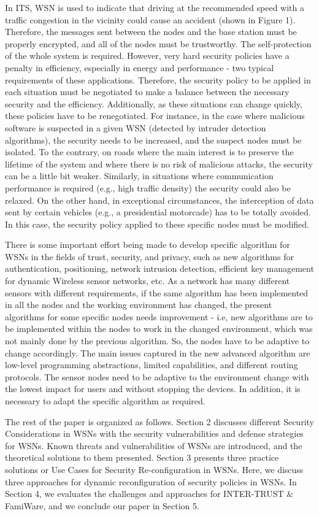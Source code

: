 \documentclass[12pt,a4paper,twoside]{report}
\begin{document}
In ITS, WSN is used to indicate that driving at the recommended speed with a traffic congestion in the vicinity could cause an accident (shown in Figure 1). Therefore, the messages sent between the nodes and the base station must be properly encrypted, and all of the nodes must be trustworthy. The self-protection of the whole system is required. However, very hard security policies have a penalty in efficiency, especially in energy and performance - two typical requirements of these applications. Therefore, the security policy to be applied in each situation must be negotiated to make a balance between the necessary security and the efficiency. Additionally, as these situations can change quickly, these policies have to be renegotiated. For instance, in the case where malicious software is suspected in a given WSN (detected by intruder detection algorithms), the security needs to be increased, and the suspect nodes must be isolated. To the contrary, on roads where the main interest is to preserve the lifetime of the system and where there is no risk of malicious attacks, the security can be a little bit weaker. Similarly, in situations where communication performance is required (e.g., high traffic density) the security could also be relaxed. On the other hand, in exceptional circumstances, the interception of data sent by certain vehicles (e.g., a presidential motorcade) has to be totally avoided. In this case, the security policy applied to these specific nodes must be modified.\par
There is some important effort being made to develop specific algorithm for WSNs in the fields of trust, security, and privacy, such as new algorithms for authentication, positioning, network intrusion detection, efficient key management for dynamic Wireless sensor networks, etc. As a network has many different sensors with different requirements, if the same algorithm has been implemented in all the nodes and the working environment has changed, the present algorithms for some specific nodes needs improvement - i.e, new algorithms are to be implemented within the nodes to work in the changed environment, which was not mainly done by the previous algorithm. So, the nodes have to be adaptive to change accordingly. The main issues captured in the new advanced algorithm are low-level programming abstractions, limited capabilities, and different routing protocols. The sensor nodes need to be adaptive to the environment change with the lowest impact for users and without stopping the devices. In addition, it is necessary to adapt the specific algorithm as required.\par
The rest of the paper is organized as follows. Section 2 discusses different Security Considerations in WSNs with the security vulnerabilities and defense strategies for WSNs. Known threats and vulnerabilities of WSNs are introduced, and the theoretical solutions to them presented. Section 3 presents three practice solutions or Use Cases for Security Re-configuration in WSNs. Here, we discuss three approaches for dynamic reconfiguration of security policies in WSNs. In Section 4, we evaluates the challenges and approaches for INTER-TRUST \& FamiWare, and we conclude our paper in Section 5.  \par
\end{document}
